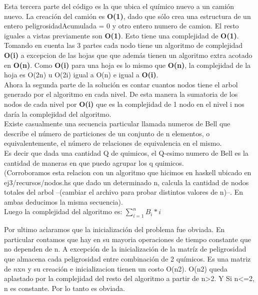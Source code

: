 \noindent 
Esta tercera parte del c\'odigo es la que ubica el qu\'imico nuevo a un cami\'on nuevo. La creaci\'on del cami\'on es \textbf{O(1)}, dado que s\'olo crea una estructura de un entero peligrosidadAcumulada = 0 y otro entero numero de camion. El resto iguales a vistas previamente son \textbf{O(1)}. Esto tiene una complejidad de \textbf{O(1)}. \\

\noindent 
Tomando en cuenta las 3 partes cada nodo tiene un algoritmo de complejidad \textbf{O(i)} a excepcion de las hojas que que adem\'as tienen un algoritmo extra acotado en \textbf{O(n)}. Como \textbf{O(i)} para una hoja es lo mismo que \textbf{O(n)}, la complejidad de la hoja es O(2n) u O(2i) igual a O(n) e igual a \textbf{O(i)}. \\

\noindent 
Ahora la segunda parte de la soluci\'on es contar cuantos nodos tiene el arbol generado por el algoritmo en cada nivel. De esta manera la sumatoria de los nodos de cada nivel por \textbf{O(i)} que es la complejidad de 1 nodo en el nivel i nos dar\'ia la complejidad del algoritmo.\\

\noindent 
Existe casualmente una secuencia particular llamada numeros de Bell que describe el número de particiones de un conjunto de n elementos, o equivalentemente, el número de relaciones de equivalencia en el mismo. \\
Es decir que dada una cantidad Q de quimicos, el Q-esimo numero de Bell es la cantidad de maneras en que puedo agrupar los q quimicos.\\
(Corroboramos esta relacion con un algoritmo que hicimos en haskell ubicado en ej3/recursos/nodos.hs que dado un determinado n, calcula la cantidad de nodos totales del arbol --(cambiar el archivo para probar distintos valores de n)--. En ambas deducimos la misma secuencia).\\

\noindent 
Luego la complejidad del algoritmo es:
$\sum\limits_{i{{=}}1}^n B_{i}*i$

\noindent 
Por ultimo aclaramos que la inicializaci\'on del problema fue obviada. En particular contamos que hay en su mayoria operaciones de tiempo constante que no dependen de n. A excepci\'on de la inicializaci\'on de la matr\'iz de peligrosidad que almacena cada peligrosidad entre combinaci\'on de 2 qu\'imicos. Es una matriz de $n$x$n$ y su creaci\'on e inicializacion tienen un costo O(n2). O(n2) queda aplastado por la complejidad del resto del algoritmo a partir de n>2. Y Si n<=2, n es constante. Por lo tanto es obviada.


